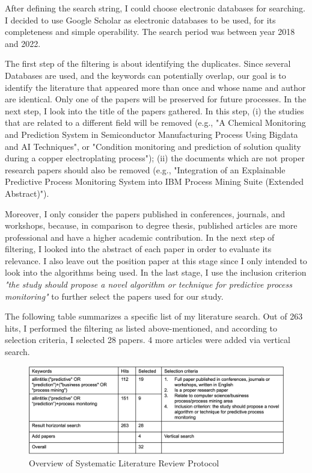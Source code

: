 \documentclass[runningheads]{llncs}
\begin{document}
		After defining the search string, I could choose electronic databases for searching. I decided to use Google Scholar as electronic databases to be used, for its completeness and simple operability. The search period was between year 2018 and 2022.
		
		The first step of the filtering is about identifying the duplicates. Since several Databases are used, and the keywords can potentially overlap, our goal is to identify the literature that appeared more than once and whose name and author are identical. Only one of the papers will be preserved for future processes. In the next step, I look into the title of the papers gathered. In this step, (i) the studies that are related to a different field will be removed (e.g., "A Chemical Monitoring and Prediction System in Semiconductor Manufacturing Process Using Bigdata and AI Techniques", or "Condition monitoring and prediction of solution quality during a copper electroplating process"); (ii) the documents which are not proper research papers should also be removed (e.g., "Integration of an Explainable Predictive Process Monitoring System into IBM Process Mining Suite (Extended Abstract)").
				
		Moreover, I only consider the papers published in conferences, journals, and workshops, because, in comparison to degree thesis, published articles are more professional and have a higher academic contribution. In the next step of filtering, I looked into the abstract of each paper in order to evaluate its relevance. I also leave out the position paper at this stage since I only intended to look into the algorithms being used. In the last stage, I use the inclusion criterion \textit{"the study should propose a novel algorithm or technique for predictive process monitoring"} to further select the papers used for our study.
		
		The following table summarizes a specific list of my literature search. Out of 263 hits, I performed the filtering as listed above-mentioned, and according to selection criteria, I selected 28 papers. 4 more articles were added via vertical search.

		\begin{figure}
		\includegraphics[width=\textwidth]{Filtering.png}
		\caption{Overview of Systematic Literature Review Protocol} \label{fig1}
		\end{figure}
		
\end{document}

